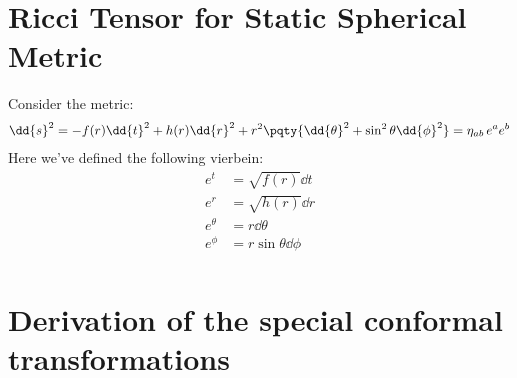 \documentclass[a4paper,10pt]{article}
\begin{document}
\section{Ricci Tensor for Static Spherical Metric}
	Consider the metric:
	\begin{equation}
	\begin{aligned}
		\dd{s}^2
		= - f(r) \dd{t}^2
			+ h(r) \dd{r}^2
			+ r^2 \pqty{
				\dd{\theta}^2
				+ \sin^2\theta \dd{\phi}^2
			}
		= \eta_{ab}\, e^a e^b
	\end{aligned}
	\end{equation}
	Here we've defined the following vierbein:
	\begin{equation}
	\begin{aligned}
		e^t &= \sqrt{f(r)} \dd{t} \\
		e^r &= \sqrt{h(r)} \dd{r} \\
		e^\theta &= r \dd{\theta} \\
		e^\phi   &= r \sin\theta \dd{\phi} \\
	\end{aligned}
	\end{equation}
	
	
	
	
	
\appendix

\section{Derivation of the special conformal transformations}
\label{sect:special_conformal}
\end{document}
